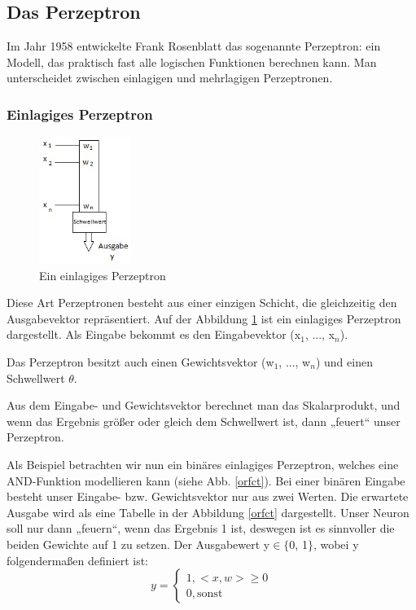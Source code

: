 \subsection{Das Perzeptron}
Im Jahr 1958 entwickelte Frank Rosenblatt das sogenannte Perzeptron: ein Modell, das praktisch fast alle logischen Funktionen berechnen kann. Man unterscheidet zwischen einlagigen und mehrlagigen Perzeptronen.

\subsubsection{Einlagiges Perzeptron}
\begin{figure}[h]
\centering
\includegraphics[width=3cm]{chapters/neural_networks/perzeptron.jpg}

\caption{Ein einlagiges Perzeptron}
\label{preceptron}

\end{figure}
Diese Art Perzeptronen besteht aus einer einzigen Schicht, die gleichzeitig den Ausgabevektor repräsentiert. Auf der Abbildung \ref{preceptron} ist ein einlagiges Perzeptron dargestellt. Als Eingabe bekommt es den Eingabevektor (x$_1$, ..., x$_n$).

Das Perzeptron besitzt auch einen Gewichtsvektor (w$_1$, ..., w$_n$) und einen Schwellwert $\theta$.

Aus dem Eingabe- und Gewichtsvektor berechnet man das Skalarprodukt, und wenn das Ergebnis größer oder gleich dem Schwellwert ist, dann „feuert“ unser Perzeptron.

Als Beispiel betrachten wir nun ein binäres einlagiges Perzeptron, welches eine AND-Funktion modellieren kann (siehe Abb. \ref{orfct}).
Bei einer binären Eingabe besteht unser Eingabe- bzw. Gewichtsvektor nur aus zwei Werten.
Die erwartete Ausgabe wird als eine Tabelle in der Abbildung \ref{orfct} dargestellt.
Unser Neuron soll nur dann „feuern“, wenn das Ergebnis 1 ist, deswegen ist es sinnvoller die beiden Gewichte auf 1 zu setzen.
Der Ausgabewert y$\in$$\{$0, 1$\}$, wobei y folgendermaßen definiert ist:
\begin{equation*}
y =
\begin{cases}
1, <x,w> \geq 0\\
0, \text{sonst}
\end{cases}
\end{equation*}

